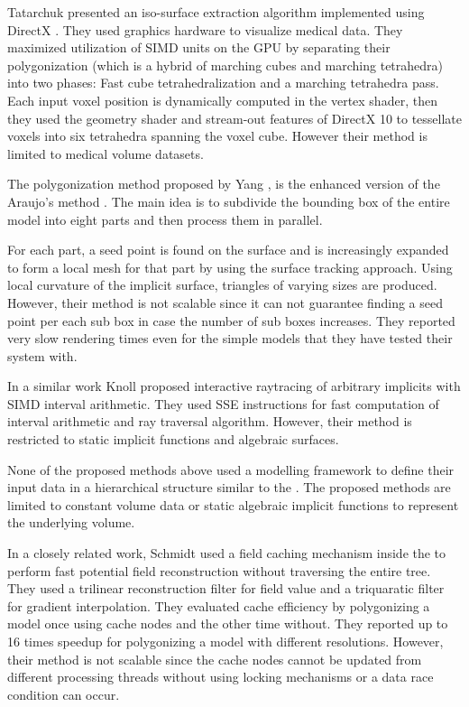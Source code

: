 Tatarchuk \etal presented an iso-surface extraction algorithm implemented using DirectX \cite{Tatarchuk2008}. They used graphics 
hardware to visualize medical data. They maximized utilization of SIMD units on the GPU by separating their polygonization (which is a 
hybrid of marching cubes and marching tetrahedra) into two phases: Fast cube tetrahedralization and a marching tetrahedra pass. Each input 
voxel position is dynamically computed in the vertex shader, then they used the geometry shader and stream-out features of DirectX 10 to 
tessellate voxels into six tetrahedra spanning the voxel cube. However their method is limited to medical volume datasets.

The polygonization method proposed by Yang \etal \cite{Yang2010}, is the enhanced version of the 
Araujo's method \cite{Rodriguesdearaujo2005}. The main idea is to subdivide the bounding box of the 
entire model into eight parts and then process them in parallel.

For each part, a seed point is found on the surface and is increasingly expanded to form a 
local mesh for that part by using the surface tracking approach. Using local curvature of the implicit 
surface, triangles of varying sizes are produced. However, their method is not scalable since 
it can not guarantee finding a seed point per each sub box in case the number of sub boxes increases. 
They reported very slow rendering times even for the simple models that they have tested their system with. 


In a similar work Knoll \etal \cite{Knoll2007} proposed interactive raytracing of arbitrary implicits with 
SIMD interval arithmetic. They used SSE instructions for fast computation of interval arithmetic 
and ray traversal algorithm. However, their method is restricted to static implicit functions and 
algebraic surfaces.

None of the proposed methods above used a modelling framework to define their input data in a hierarchical structure similar to 
the \blobns. The proposed methods are limited to constant volume data or static algebraic implicit 
functions to represent the underlying volume. 

In a closely related work, Schmidt \etal \cite{SWG2005} used a field caching mechanism inside the \blob 
to perform fast potential field reconstruction without traversing the entire tree. They used a trilinear 
reconstruction filter for field value and a triquaratic filter for gradient interpolation. They evaluated cache 
efficiency by polygonizing a \blob model once using cache nodes and the other time without. They 
reported up to 16 times speedup for polygonizing a model with different resolutions. However, their 
method is not scalable since the cache nodes cannot be updated from different processing threads 
without using locking mechanisms or a data race condition can occur. 

